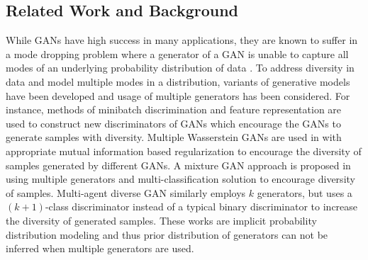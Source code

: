 

\subsection{Related Work and Background}

While GANs have high success in many applications, they are known to
suffer in a mode dropping problem where a generator of a GAN is unable
to capture all modes of an underlying probability distribution of data
\cite{2018arXiv180600880K}. To address diversity in data and model
multiple modes in a distribution, variants of generative models have been developed and
usage of multiple generators
has been considered. For instance, methods of minibatch discrimination \cite{NIPS2016_6125} and feature representation \cite{bang2018icml} are used to construct new discriminators of GANs which encourage the GANs to generate samples with diversity. Multiple Wasserstein GANs \cite{2017arXiv170107875A} are used in \cite{2018arXiv180600880K} with appropriate mutual information based regularization to encourage the diversity of samples generated by different GANs.
A mixture GAN approach is proposed in \cite{hoang2018mgan} using multiple generators and multi-classification solution to
encourage diversity of samples. Multi-agent diverse GAN \cite{DBLP:journals/corr/GhoshKNTD17} similarly employs $k$ generators, but uses a $(k+1)$-class discriminator instead of a typical binary discriminator to increase the diversity of generated samples. These works are implicit probability distribution modeling and thus prior distribution of generators can not be inferred when multiple generators are used.

